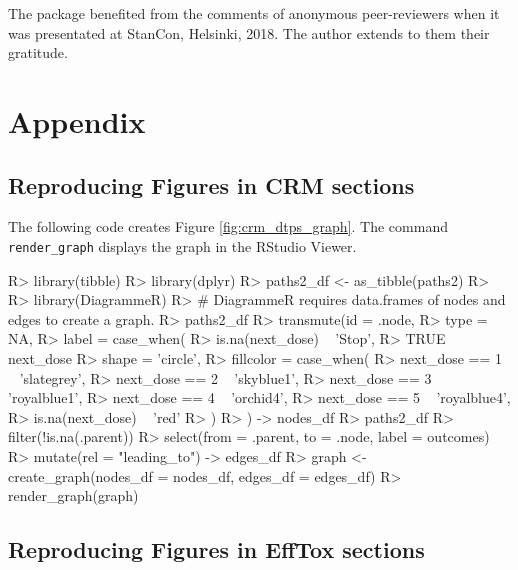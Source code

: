 \documentclass[article]{jss}
\begin{document}
The  package benefited from the comments of anonymous
peer-reviewers when it was presentated at StanCon, Helsinki, 2018. The
author extends to them their gratitude.

\hypertarget{appendix}{%
\section{Appendix}\label{appendix}}

\hypertarget{reproducing-figures-in-crm-sections}{%
\subsection{Reproducing Figures in CRM
sections}\label{reproducing-figures-in-crm-sections}}

The following code creates Figure \ref{fig:crm_dtps_graph}. The command
\texttt{render\_graph} displays the graph in the RStudio Viewer.

\begin{CodeChunk}

\begin{CodeInput}
R> library(tibble)
R> library(dplyr)
R> paths2_df <- as_tibble(paths2)
R> 
R> library(DiagrammeR)
R> # DiagrammeR requires data.frames of nodes and edges to create a graph.
R> paths2_df %
R>   transmute(id = .node,
R>             type = NA,
R>             label = case_when(
R>               is.na(next_dose) ~ 'Stop',
R>               TRUE ~ next_dose %
R>             shape = 'circle',
R>             fillcolor = case_when(
R>               next_dose == 1 ~ 'slategrey',
R>               next_dose == 2 ~ 'skyblue1',
R>               next_dose == 3 ~ 'royalblue1',
R>               next_dose == 4 ~ 'orchid4',
R>               next_dose == 5 ~ 'royalblue4',
R>               is.na(next_dose) ~ 'red'
R>             )
R>   ) -> nodes_df
R> paths2_df %
R>   filter(!is.na(.parent)) %
R>   select(from = .parent, to = .node, label = outcomes) %
R>   mutate(rel = "leading_to") -> edges_df
R> graph <- create_graph(nodes_df = nodes_df, edges_df = edges_df)
R> render_graph(graph)
\end{CodeInput}
\end{CodeChunk}

\hypertarget{reproducing-figures-in-efftox-sections}{%
\subsection{Reproducing Figures in EffTox
sections}\label{reproducing-figures-in-efftox-sections}}
\end{document}
